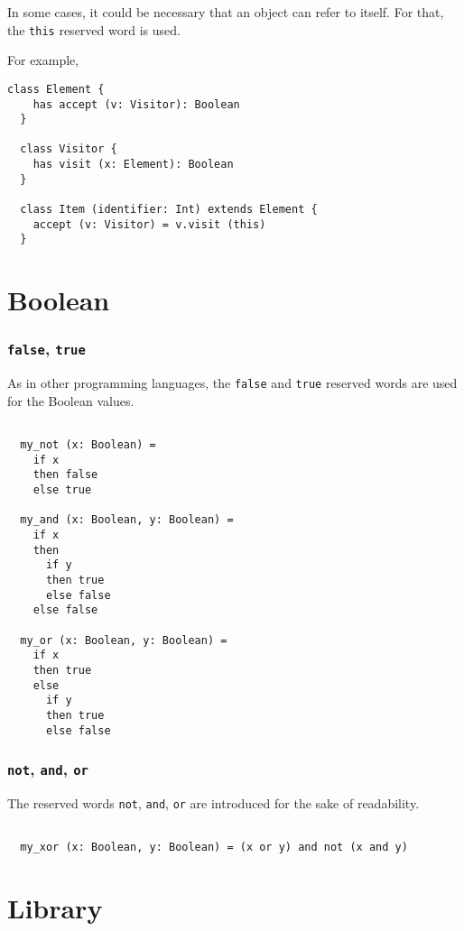 \documentclass[12pt,a4paper]{book}
\newcommand{\srccode}[1]{\texttt{{#1}}}
\newcommand{\reservedWord}[1]{{\color{blue}\srccode{#1}}\xspace}
\newcommand{\sthis}{\reservedWord{this}}
\newcommand{\sfalse}{\reservedWord{false}}
\newcommand{\strue}{\reservedWord{true}}
\newcommand{\snot}{\reservedWord{not}}
\newcommand{\sand}{\reservedWord{and}}
\newcommand{\sor}{\reservedWord{or}}
\begin{document}
    In some cases, it could be necessary that an object can refer to itself.
    For that, the \sthis reserved word is used.

    For example,
    \begin{lstlisting}[label={lst:exampleExtendsElement}]
  class Element {
    has accept (v: Visitor): Boolean
  }

  class Visitor {
    has visit (x: Element): Boolean
  }

  class Item (identifier: Int) extends Element {
    accept (v: Visitor) = v.visit (this)
  }
    \end{lstlisting}


    \section{Boolean}

    \subsubsection{\sfalse, \strue}

    As in other programming languages, the \sfalse and \strue reserved words are used for the Boolean values.

    \begin{lstlisting}[label={lst:exampleFalseTrue}]

  my_not (x: Boolean) =
    if x
    then false
    else true

  my_and (x: Boolean, y: Boolean) =
    if x
    then
      if y
      then true
      else false
    else false

  my_or (x: Boolean, y: Boolean) =
    if x
    then true
    else
      if y
      then true
      else false
    \end{lstlisting}

    \subsubsection{\snot, \sand, \sor}

    The reserved words \snot, \sand, \sor are introduced for the sake of readability.

    \begin{lstlisting}[label={lst:exampleNotAndOr}]

  my_xor (x: Boolean, y: Boolean) = (x or y) and not (x and y)

    \end{lstlisting}


    \section{Library}
\end{document}
